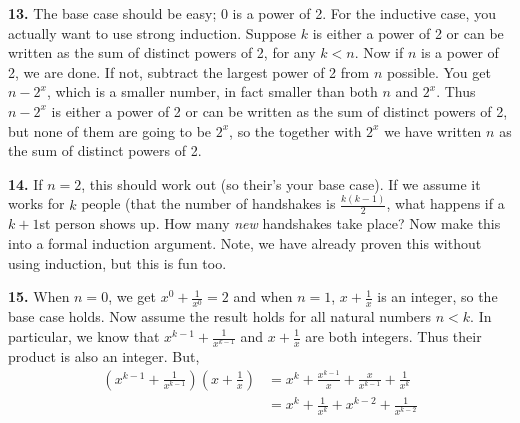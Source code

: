\documentclass[10pt,]{book}
\theoremstyle{plain}
\theoremstyle{definition}
\theoremstyle{definition}
\theoremstyle{definition}
\numberwithin{equation}{chapter}
\newcommand{\lt}{ < }
\newcommand{\amp}{ & }
\begin{document}
%
\par\smallskip
\noindent\textbf{13.}\quad{}
The base case should be easy; 0 is a power of 2. For the inductive case, you actually want to use strong induction. Suppose \(k\) is either a power of 2 or can be written as the sum of distinct powers of 2, for any \(k \lt  n\). Now if \(n\) is a power of 2, we are done. If not, subtract the largest power of 2 from \(n\) possible. You get \(n - 2^x\), which is a smaller number, in fact smaller than both \(n\) and \(2^x\). Thus \(n-2^x\) is either a power of 2 or can be written as the sum of distinct powers of 2, but none of them are going to be \(2^x\), so the together with \(2^x\) we have written \(n\) as the sum of distinct powers of 2.
%
\par\smallskip
\noindent\textbf{14.}\quad{}
If \(n = 2\), this should work out (so their's your base case). If we assume it works for \(k\) people (that the number of handshakes is \(\frac{k(k-1)}{2}\), what happens if a \(k+1\)st person shows up. How many \emph{new} handshakes take place? Now make this into a formal induction argument. Note, we have already proven this without using induction, but this is fun too.
%
\par\smallskip
\noindent\textbf{15.}\quad{}
When \(n = 0\), we get \(x^0 +\frac{1}{x^0} = 2\) and when \(n = 1\), \(x + \frac{1}{x}\) is an integer, so the base case holds. Now assume the result holds for all natural numbers \(n \lt  k\). In particular, we know that \(x^{k-1} + \frac{1}{x^{k-1}}\) and \(x + \frac{1}{x}\) are both integers. Thus their product is also an integer. But,
\begin{align*}
  \left(x^{k-1} + \frac{1}{x^{k-1}}\right)\left(x + \frac{1}{x}\right) \amp  = x^k + \frac{x^{k-1}}{x} + \frac{x}{x^{k-1}} + \frac{1}{x^k}\\
  \amp  = x^k + \frac{1}{x^k} + x^{k-2} + \frac{1}{x^{k-2}}
\end{align*}
%
\par
\end{document}
